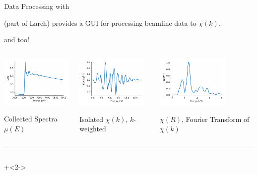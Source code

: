 \begin{slide}{Data Processing with {\xasviewer}  }

  \begin{cenpage}{135mm}
  {\xasviewer} (part of Larch) provides a GUI for
  processing beamline data to $\chi(k)$.

  \vmm
  {\athena} and {\sixpack} too!

  \begin{columns}
    \begin{column}{45mm}

      \includegraphics[width=35mm]{figs/experiment/feo_mu}

      \vmm
      Collected Spectra $\mu(E)$

    \end{column}
    \begin{column}{45mm}
      \includegraphics[width=35mm]{figs/experiment/feo_chik}

      \vmm
      Isolated $\chi(k)$, $k$-weighted

    \end{column}
    \begin{column}{45mm}
      \includegraphics[width=35mm]{figs/experiment/feo_chir}

      \vmm
      $\chi(R)$, Fourier Transform of $\chi(k)$

    \end{column}
  \end{columns}

  \vmm \hrule

  \vmm\vmm

{\small{
  \begin{columns}[T]
    \begin{column}{65mm}
      \onslide+<2->


\end{column}
\end{columns}}}
\end{cenpage}
\end{slide}
